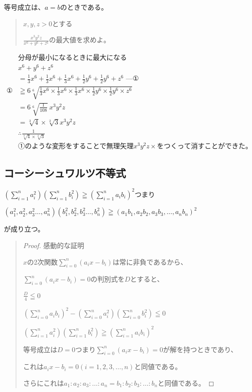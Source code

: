 \documentclass[uplatex,fleqn]{jsbook}
\begin{document}
等号成立は、$a=b$のときである。

\begin{quote}
    $x,y,z>0$とする

    $\displaystyle \frac{x^3y^2z}{x^6+y^6+z^6}$の最大値を求めよ。
\end{quote}

\begin{align*}
    &\text{分母が最小になるときに最大になる}\\
    &x^6+y^6+z^6\\
    &=\frac{1}{3}x^6+\frac{1}{3}x^6+\frac{1}{3}x^6+\frac{1}{2}y^6+\frac{1}{2}y^6+z^6\text{ ---①}\\
    \text{①}&\geqq6\sqrt[6]{\frac{1}{3}x^6\times\frac{1}{3}x^6\times\frac{1}{3}x^6\times\frac{1}{2}y^6\times\frac{1}{2}y^6\times z^6}\\
    &=6\sqrt[6]{\frac{1}{108}}\ x^3y^2z\\
    &=\sqrt[3]{4}\times\sqrt[2]{3}x^3y^2z\\
    &\therefore \frac{1}{\sqrt[3]{4}\times\sqrt[2]{3}}\\
    &\text{①のような変形をすることで無理矢理}x^3y^2z\times{をつくって消すことができた。}
\end{align*}

\subsection{コーシーシュワルツ不等式}
$\displaystyle \left(\sum_{i=1}^n a^2_i\right)\left(\sum_{i=1}^n b^2_i\right)\geqq\left(\sum_{i=1}^n a_ib_i\right)^2$つまり

$\left(a^2_1,a^2_2,a^2_3\dots,a^2_n\right)\left(b^2_1,b^2_2,b^2_3\dots,b^2_n\right)\geqq\left(a_1b_1,a_2b_2,a_3b_3,\dots,a_nb_n\right)^2$

が成り立つ。
\begin{quote}
    \begin{proof}
        感動的な証明

        $x$の2次関数$\displaystyle \sum_{i=0}^{n}(a_ix-b_i)$は常に非負であるから、

        $\displaystyle \sum_{i=0}^{n}(a_ix-b_i)=0$の判別式を$D$とすると、

        $\displaystyle\frac{D}{4}\leqq 0$

        $\displaystyle \left(\sum_{i=0}^{n}a_ib_i\right)^2-\left(\sum_{i=0}^{n}a_i^2\right)\left(\sum_{i=0}^{n}b_i^2\right)\leqq 0$

        $\displaystyle \left(\sum_{i=1}^n a^2_i\right)\left(\sum_{i=1}^n b^2_i\right)\geqq\left(\sum_{i=1}^n a_ib_i\right)^2$

        等号成立は$D=0$つまり$\displaystyle \sum_{i=0}^{n}(a_ix-b_i)=0$が解を持つときであり、

        これは$a_ix-b_i=0 \left(i = 1,2,3,\dots ,n\right)$と同値である。

        さらにこれは$a_1:a_2:a_3:\dots:a_n=b_1:b_2:b_3:\dots:b_n$と同値である。
    \end{proof}
\end{quote}
\end{document}
